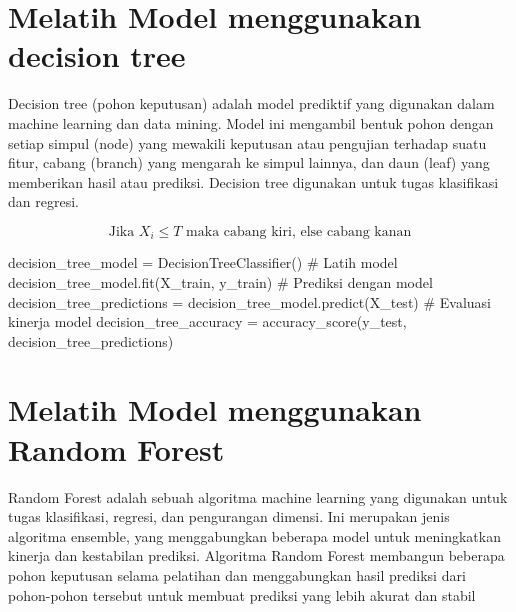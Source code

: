 \documentclass[
  letterpaper,
]{krantz}
\makeatletter
\newenvironment{Shaded}{\begin{snugshade}}{\end{snugshade}}
\newcommand{\CommentTok}[1]{\textcolor[rgb]{0.37,0.37,0.37}{#1}}
\newcommand{\NormalTok}[1]{\textcolor[rgb]{0.00,0.23,0.31}{#1}}
\newcommand{\OperatorTok}[1]{\textcolor[rgb]{0.37,0.37,0.37}{#1}}
\newenvironment{kframe}{%
\medskip{}
\setlength{\fboxsep}{.8em}
 \def\at@end@of@kframe{}%
 \ifinner\ifhmode%
  \def\at@end@of@kframe{\end{minipage}}%
  \begin{minipage}{\columnwidth}%
 \fi\fi%
 \def\FrameCommand##1{\hskip\@totalleftmargin \hskip-\fboxsep
 \colorbox{shadecolor}{##1}\hskip-\fboxsep
     \hskip-\linewidth \hskip-\@totalleftmargin \hskip\columnwidth}%
 \MakeFramed {\advance\hsize-\width
   \@totalleftmargin\z@ \linewidth\hsize
   \@setminipage}}%
 {\par\unskip\endMakeFramed%
 \at@end@of@kframe}
\renewenvironment{Shaded}{\begin{kframe}}{\end{kframe}}
\makeatother
\begin{document}
\hypertarget{melatih-model-menggunakan-decision-tree-1}{%
\section{Melatih Model menggunakan decision
tree}\label{melatih-model-menggunakan-decision-tree-1}}

Decision tree (pohon keputusan) adalah model prediktif yang digunakan
dalam machine learning dan data mining. Model ini mengambil bentuk pohon
dengan setiap simpul (node) yang mewakili keputusan atau pengujian
terhadap suatu fitur, cabang (branch) yang mengarah ke simpul lainnya,
dan daun (leaf) yang memberikan hasil atau prediksi. Decision tree
digunakan untuk tugas klasifikasi dan regresi.

\begin{equation}
\text{Jika } X_i \leq T \text{ maka cabang kiri, else cabang kanan}
\end{equation}

\begin{Shaded}
\begin{Highlighting}[]
\NormalTok{decision\_tree\_model }\OperatorTok{=}\NormalTok{ DecisionTreeClassifier()}
\CommentTok{\# Latih model}
\NormalTok{decision\_tree\_model.fit(X\_train, y\_train)}
\CommentTok{\# Prediksi dengan model}
\NormalTok{decision\_tree\_predictions }\OperatorTok{=}\NormalTok{ decision\_tree\_model.predict(X\_test)}
\CommentTok{\# Evaluasi kinerja model}
\NormalTok{decision\_tree\_accuracy }\OperatorTok{=}\NormalTok{ accuracy\_score(y\_test, decision\_tree\_predictions)}
\end{Highlighting}
\end{Shaded}

\hypertarget{melatih-model-menggunakan-random-forest-1}{%
\section{Melatih Model menggunakan Random
Forest}\label{melatih-model-menggunakan-random-forest-1}}

Random Forest adalah sebuah algoritma machine learning yang digunakan
untuk tugas klasifikasi, regresi, dan pengurangan dimensi. Ini merupakan
jenis algoritma ensemble, yang menggabungkan beberapa model untuk
meningkatkan kinerja dan kestabilan prediksi. Algoritma Random Forest
membangun beberapa pohon keputusan selama pelatihan dan menggabungkan
hasil prediksi dari pohon-pohon tersebut untuk membuat prediksi yang
lebih akurat dan stabil
\end{document}
